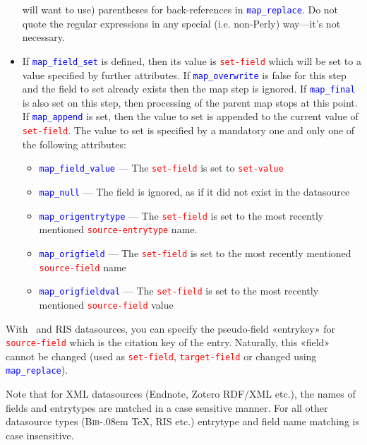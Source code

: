 \documentclass{ltxdockit}
\def\BibTeX{\textsc{Bib}\kern-.08em \TeX}
\begin{document}
\begin{itemize}
  will want to use) parentheses for back-references in \textcolor{blue}{\texttt{map\_replace}}.
  Do not quote the regular expressions in any special (i.e. non-Perly) way---it's not
  necessary.
\item If \textcolor{blue}{\texttt{map\_field\_set}} is defined, then its
  value is \textcolor{red}{\texttt{set-field}} which will be set to a value
  specified by further attributes. If
  \textcolor{blue}{\texttt{map\_overwrite}} is false for this step and the
  field to set already exists then the map step is ignored. If
  \textcolor{blue}{\texttt{map\_final}} is also set on this step, then
  processing of the parent map stops at this point. If
  \textcolor{blue}{\texttt{map\_append}} is set, then the value to set is
  appended to the current value of \textcolor{red}{\texttt{set-field}}. The
  value to set is specified by a mandatory one and only one of the
  following attributes:
  \begin{itemize}
    \item \textcolor{blue}{\texttt{map\_field\_value}} --- The
      \textcolor{red}{\texttt{set-field}} is set to
      \textcolor{red}{\texttt{set-value}}
    \item \textcolor{blue}{\texttt{map\_null}} --- The field is ignored, as
      if it did not exist in the datasource
    \item \textcolor{blue}{\texttt{map\_origentrytype}} --- The
      \textcolor{red}{\texttt{set-field}} is set to the
      most recently mentioned \textcolor{red}{\texttt{source-entrytype}} name.
    \item \textcolor{blue}{\texttt{map\_origfield}} --- The
      \textcolor{red}{\texttt{set-field}} is set to the most recently
      mentioned \textcolor{red}{\texttt{source-field}} name
    \item \textcolor{blue}{\texttt{map\_origfieldval}} --- The
      \textcolor{red}{\texttt{set-field}} is set to the most recently
      mentioned \textcolor{red}{\texttt{source-field}} value
  \end{itemize}
\end{itemize}

\noindent With \bibtex\ and RIS datasources, you can specify the
pseudo-field «entrykey» for \textcolor{red}{\texttt{source-field}}
which is the citation key of the entry. Naturally, this «field» cannot
be changed (used as \textcolor{red}{\texttt{set-field}},
\textcolor{red}{\texttt{target-field}} or changed using
\textcolor{blue}{\texttt{map\_replace}}).

Note that for XML datasources (Endnote, Zotero RDF/XML etc.), the names of
fields and entrytypes are matched in a case sensitive manner. For all other
datasource types (\BibTeX, RIS etc.) entrytype and field name matching is
case insensitive.
\end{document}
